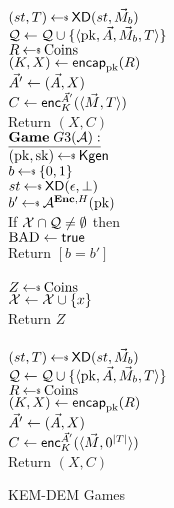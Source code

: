 \begin{figure}[tbhp]
\begin{center}
{\medskip
{}\\
$(st, T) \getsr \mdalg(st,\vmsg_b)$\\
$\mathcal{Q} \gets \mathcal{Q} \cup \{\langle \mathrm{pk},\vec{A},\vec{M}_b,T\rangle\}$\\
$R \getsr \mathrm{Coins}$\\
$(K,X) \gets \mathsf{encap}_{\mathrm{pk}}^{}(R)$\\
$\vec{A}' \gets (\vec{A}, X)$\\
$C \gets {\mathsf{enc}}_{K}^{\vec{A}'}(\langle \vec{M}, T\rangle)$\\
Return $(X,C)$\\
}
{
$\gamev{G3}{\advA}$\\
 $(\pk,\sk)\getsr\Kgen$\\
 $b \getsr \bits$ \\
 $st \getsr \mdalg(\epsilon,\bot)$\\
 $b' \getsr \advA^{\encOracle,H}(\pk)$\\
 If $\mathcal{X} \cap \mathcal{Q} \neq \emptyset$ then \\
\nudge $\mathrm{BAD}\gets\textsf{true}$\\
Return $[b=b']$\\ 

\medskip
{}\\
  $Z \getsr \mathrm{Coins}$\\
  $\mathcal{X} \gets \mathcal{X} \cup \{x\}$\\
  Return $Z$\\

\medskip
{}\\
$(st, T) \getsr \mdalg(st,\vmsg_b)$\\
$\mathcal{Q} \gets \mathcal{Q} \cup \{\langle \mathrm{pk},\vec{A},\vec{M}_b,T\rangle\}$\\
$R \getsr \mathrm{Coins}$\\
$(K,X) \gets \mathsf{encap}_{\mathrm{pk}}^{}(R)$\\
$\vec{A}' \gets (\vec{A}, X)$\\
$C \gets {\mathsf{enc}}_{K}^{\vec{A}'}(\langle \vec{M}, 0^{|T|}\rangle)$\\
Return $(X,C)$\\
}
\caption{KEM-DEM Games}
\label{fig:CPA-KEMDEM}
\end{center}
\end{figure}

